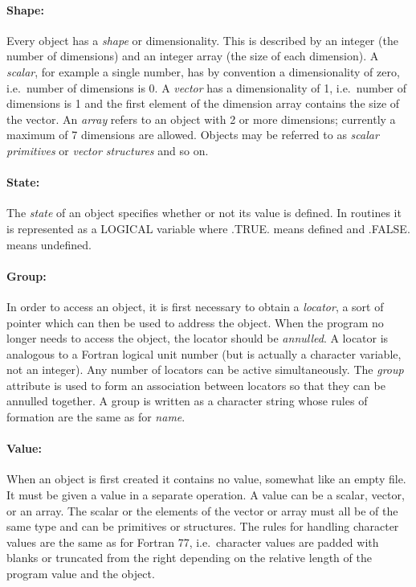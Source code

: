 \paragraph{Shape:}\hfill

Every object has a {\em shape} or dimensionality.
This is described by an integer (the number of dimensions) and an integer array
(the size of each dimension).
A {\em scalar}, for example a single number, has by convention a dimensionality
of zero, i.e.\ number of dimensions is 0.
A {\em vector} has a dimensionality of 1, i.e.\ number of dimensions is 1 and
the first element of the dimension array contains the size of the vector.
An {\em array} refers to an object with 2 or more dimensions; currently a
maximum of 7 dimensions are allowed.
Objects may be referred to as {\em scalar primitives} or
{\em vector structures} and so on.

\paragraph{State:}\hfill

The {\em state} of an object specifies whether or not its value is defined.
In routines it is represented as a LOGICAL variable where .TRUE. means defined
and .FALSE. means undefined.

\paragraph{Group:}\hfill

In order to access an object, it is first necessary to obtain a {\em locator\/},
a sort of pointer which can then be used to address the object.
When the program no longer needs to access the object, the locator should be
{\em annulled}.
A locator is analogous to a Fortran logical unit number (but is actually a
character variable, not an integer).
Any number of locators can be active simultaneously.
The {\em group} attribute is used to form an association between locators so
that they can be annulled together.
A group is written as a character string whose rules of formation are the same
as for {\em name}.

\paragraph{Value:}\hfill

When an object is first created it contains no value, somewhat like
an empty file.
It must be given a value in a separate operation.
A value can be a scalar, vector, or an array.
The scalar or the elements of the vector or array must all be of the same
type and can be primitives or structures.
The rules for handling character values are the same as for Fortran 77, i.e.\
character values are padded with blanks or truncated from the right depending on
the relative length of the program value and the object.

